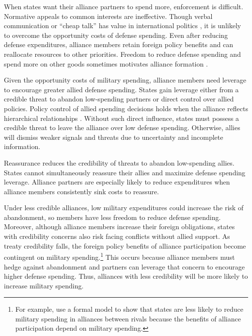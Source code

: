 \documentclass[12pt]{article}
\begin{document}
When states want their alliance partners to spend more, enforcement is difficult. 
Normative appeals to common interests are ineffective. 
Though verbal communication or ``cheap talk'' has value in international politics \citep{Trager2010}, it is unlikely to overcome the opportunity costs of defense spending. 
Even after reducing defense expenditures, alliance members retain foreign policy benefits and can reallocate resources to other priorities. 
Freedom to reduce defense spending and spend more on other goods sometimes motivates alliance formation \citep{Kimball2010, AllenDigiuseppe2013}. 


Given the opportunity costs of military spending, alliance members need leverage to encourage greater allied defense spending. 
States gain leverage either from a credible threat to abandon low-spending partners or direct control over allied policies. 
Policy control of allied spending decisions holds when the alliance reflects hierarchical relationships \citep{Lake1996}. 
Without such direct influence, states must possess a credible threat to leave the alliance over low defense spending. 
Otherwise, allies will dismiss weaker signals and threats due to uncertainty and incomplete information. 


Reassurance reduces the credibility of threats to abandon low-spending allies. 
States cannot simultaneously reassure their allies and maximize defense spending leverage. 
Alliance partners are especially likely to reduce expenditures when alliance members consistently sink costs to reassure. 


Under less credible alliances, low military expenditures could increase the risk of abandonment, so members have less freedom to reduce defense spending. 
Moreover, although alliance members increase their foreign obligations, states with credibility concerns also risk facing conflicts without allied support. 
As treaty credibility falls, the foreign policy benefits of alliance participation become contingent on military spending.\footnote{For example, \citep{NiouZeigler2019} use a formal model to show that states are less likely to reduce military spending in alliances between rivals because the benefits of alliance participation depend on military spending.} 
This occurs because alliance members must hedge against abandonment and partners can leverage that concern to encourage higher defense spending.
Thus, alliances with less credibility will be more likely to increase military spending. 
\end{document}
